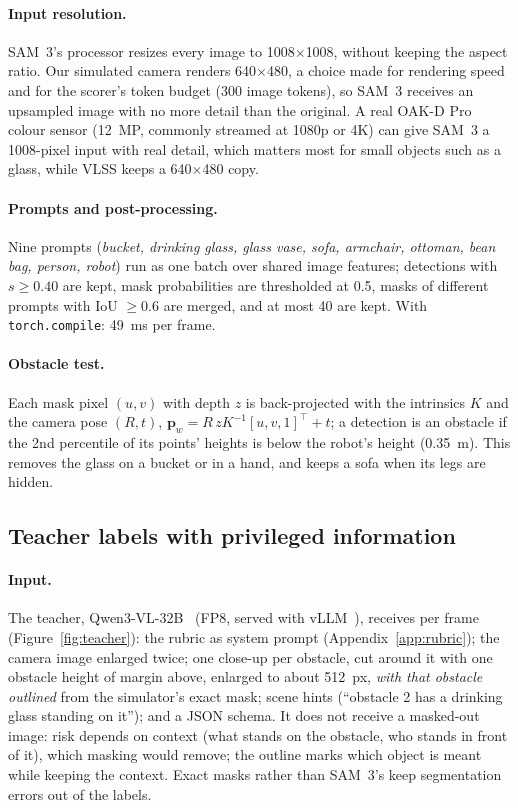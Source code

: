 \documentclass[10pt,a4paper]{article}
\newcommand{\code}[1]{\texttt{#1}}
\begin{document}
\paragraph{Input resolution.} SAM~3's processor resizes every image to 1008$\times$1008, without keeping the aspect ratio. Our
simulated camera renders 640$\times$480, a choice made for rendering speed and for the scorer's token budget (300 image tokens),
so SAM~3 receives an upsampled image with no more detail than the original. A real OAK-D Pro colour sensor (12~MP, commonly
streamed at 1080p or 4K) can give SAM~3 a 1008-pixel input with real detail, which matters most for small objects such as a glass,
while VLSS keeps a 640$\times$480 copy.

\paragraph{Prompts and post-processing.} Nine prompts (\emph{bucket, drinking glass, glass vase, sofa, armchair, ottoman, bean bag,
person, robot}) run as one batch over shared image features; detections with $s\geq0.40$ are kept, mask probabilities are
thresholded at 0.5, masks of different prompts with IoU $\geq0.6$ are merged, and at most 40 are kept. With
\code{torch.compile}: 49~ms per frame.

\paragraph{Obstacle test.} Each mask pixel $(u,v)$ with depth $z$ is back-projected with the intrinsics $K$ and the camera pose
$(R,t)$, $\bm p_w = R\,zK^{-1}[u,v,1]^\top + t$; a detection is an obstacle if the 2nd percentile of its points' heights is below the
robot's height (0.35~m). This removes the glass on a bucket or in a hand, and keeps a sofa when its legs are hidden.

\subsection{Teacher labels with privileged information}\label{sec:teacher}

\paragraph{Input.} The teacher, Qwen3-VL-32B~\cite{bai2025qwen3vl} (FP8, served with vLLM~\cite{kwon2023vllm}), receives per frame
(Figure~\ref{fig:teacher}): the rubric as system prompt (Appendix~\ref{app:rubric}); the camera image enlarged twice; one close-up per
obstacle, cut around it with one obstacle height of margin above, enlarged to about 512~px, \emph{with that obstacle outlined} from
the simulator's exact mask; scene hints (``obstacle 2 has a drinking glass standing on it''); and a JSON schema. It does not receive
a masked-out image: risk depends on context (what stands on the obstacle, who stands in front of it), which masking would remove;
the outline marks which object is meant while keeping the context. Exact masks rather than SAM~3's keep segmentation errors out of
the labels.
\end{document}
